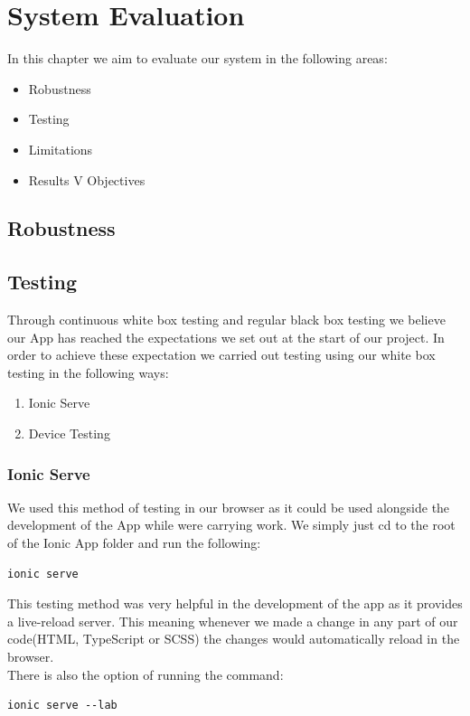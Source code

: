 \documentclass[12pt,a4paper,oneside,openany]{book}
\begin{document}
\chapter{System Evaluation}
In this chapter we aim to evaluate our system in the following areas:
\begin{itemize}
    \item Robustness
    \item Testing
    \item Limitations
    \item Results V Objectives
\end{itemize}

\section{Robustness}

\section{Testing}
Through continuous white box testing and regular black box testing we believe our App has reached the expectations we set out at the start of our project. In order to achieve these expectation we carried out testing using our white box testing in the following ways:
\begin{enumerate}
    \item Ionic Serve
    \item Device Testing
\end{enumerate}

\subsection{Ionic Serve}
We used this method of testing in our browser as it could be used alongside the development of the App while were carrying work. We simply just cd to the root of the Ionic App folder and run the following:
\begin{verbatim}
ionic serve
\end{verbatim}

This testing method was very helpful in the development of the app as it provides a live-reload server. This meaning whenever we made a change in any part of our code(HTML, TypeScript or SCSS) the changes would automatically reload in the browser.
\\
There is also the option of running the command:
\begin{verbatim}
ionic serve --lab
\end{verbatim}
\end{document}
